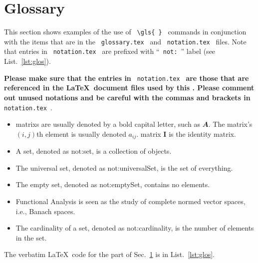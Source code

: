 \newpage
\section{Glossary}
\label{sec:glos}

This section shows examples of the use of \verb| \gls{ } | commands in conjunction with the items that are in the \verb| glossary.tex | and \verb| notation.tex | files.  Note that entries in  \verb| notation.tex |  are prefixed with ``\verb| not: |'' label (see List.~\ref{lst:glos}).

\textbf{Please make sure that the entries in} \verb| notation.tex |\textbf{  are those that are referenced in the \LaTeX \ document files used by this \documentType.  Please comment out unused notations and be careful with the commas and brackets  in} \verb| notation.tex |.

\begin{itemize}

	\item \Glspl{matrix} are usually denoted by a bold capital letter, such as $\mathbfit{A}$. The \gls{matrix}'s $(i,j)$th element is usually denoted $a_{ij}$. \Gls{matrix} $\mathbf{I}$ is the identity \gls{matrix}.

	\item A set, denoted as \gls{not:set}, is a collection of objects.

	\item The universal set,  denoted as \gls{not:universalSet}, is the set of everything.

	\item The empty set, denoted as \gls{not:emptySet}, contains no elements.

	\item \Gls{Functional Analysis} is seen as the study of complete normed vector spaces, i.e., Banach spaces.

	\item The cardinality of a set, denoted as \gls{not:cardinality}, is the number of elements in the set.

\end{itemize}


The verbatim \LaTeX \ code for the part of Sec.~\ref{sec:glos} is in List.~\ref{lst:glos}.

